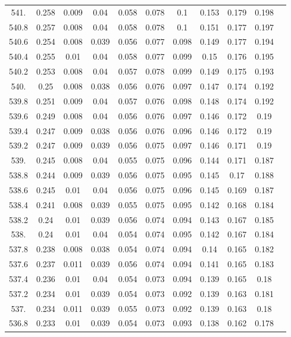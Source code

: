 \documentclass[12pt]{ctexart}
\numberwithin{equation}{section}
\begin{document}
\begin{longtable}{ccccccccccc}
541.	&	0.258	&	0.009	&	0.04	&	0.058	&	0.078	&	0.1	&	0.153	&	0.179	&	0.198	\\
540.8	&	0.257	&	0.008	&	0.04	&	0.058	&	0.078	&	0.1	&	0.151	&	0.177	&	0.197	\\
540.6	&	0.254	&	0.008	&	0.039	&	0.056	&	0.077	&	0.098	&	0.149	&	0.177	&	0.194	\\
540.4	&	0.255	&	0.01	&	0.04	&	0.058	&	0.077	&	0.099	&	0.15	&	0.176	&	0.195	\\
540.2	&	0.253	&	0.008	&	0.04	&	0.057	&	0.078	&	0.099	&	0.149	&	0.175	&	0.193	\\
540.	&	0.25	&	0.008	&	0.038	&	0.056	&	0.076	&	0.097	&	0.147	&	0.174	&	0.192	\\
539.8	&	0.251	&	0.009	&	0.04	&	0.057	&	0.076	&	0.098	&	0.148	&	0.174	&	0.192	\\
539.6	&	0.249	&	0.008	&	0.04	&	0.056	&	0.076	&	0.097	&	0.146	&	0.172	&	0.19	\\
539.4	&	0.247	&	0.009	&	0.038	&	0.056	&	0.076	&	0.096	&	0.146	&	0.172	&	0.19	\\
539.2	&	0.247	&	0.009	&	0.039	&	0.056	&	0.075	&	0.097	&	0.146	&	0.171	&	0.19	\\
539.	&	0.245	&	0.008	&	0.04	&	0.055	&	0.075	&	0.096	&	0.144	&	0.171	&	0.187	\\
538.8	&	0.244	&	0.009	&	0.039	&	0.056	&	0.075	&	0.095	&	0.145	&	0.17	&	0.188	\\
538.6	&	0.245	&	0.01	&	0.04	&	0.056	&	0.075	&	0.096	&	0.145	&	0.169	&	0.187	\\
538.4	&	0.241	&	0.008	&	0.039	&	0.055	&	0.075	&	0.095	&	0.142	&	0.168	&	0.184	\\
538.2	&	0.24	&	0.01	&	0.039	&	0.056	&	0.074	&	0.094	&	0.143	&	0.167	&	0.185	\\
538.	&	0.24	&	0.01	&	0.04	&	0.054	&	0.074	&	0.095	&	0.142	&	0.167	&	0.184	\\
537.8	&	0.238	&	0.008	&	0.038	&	0.054	&	0.074	&	0.094	&	0.14	&	0.165	&	0.182	\\
537.6	&	0.237	&	0.011	&	0.039	&	0.056	&	0.074	&	0.094	&	0.141	&	0.165	&	0.183	\\
537.4	&	0.236	&	0.01	&	0.04	&	0.054	&	0.073	&	0.094	&	0.139	&	0.165	&	0.18	\\
537.2	&	0.234	&	0.01	&	0.039	&	0.054	&	0.073	&	0.092	&	0.139	&	0.163	&	0.181	\\
537.	&	0.234	&	0.011	&	0.039	&	0.055	&	0.073	&	0.092	&	0.139	&	0.163	&	0.18	\\
536.8	&	0.233	&	0.01	&	0.039	&	0.054	&	0.073	&	0.093	&	0.138	&	0.162	&	0.178	\\

\end{longtable}
\end{document}
